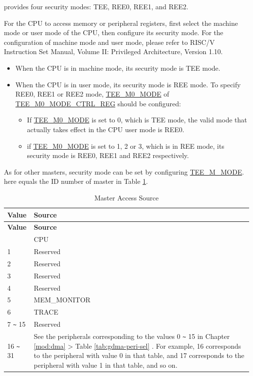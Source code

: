 \documentclass[main\_\_EN.tex]{subfiles}
\begin{document}
\chipname{} provides four security modes: TEE, REE0, REE1, and REE2.

For the CPU to access memory or peripheral registers, first select the machine mode or user mode of the CPU, then configure its security mode. For the configuration of machine mode and user mode, please refer to RISC\-/V Instruction Set Manual, Volume II: Privileged Architecture, Version 1.10.
\begin{itemize}
    \item When the CPU is in machine mode, its security mode is TEE mode.
    \item When the CPU is in user mode, its security mode is REE mode. To specify REE0, REE1 or REE2 mode, \hyperref[fielddesc:TEEM0MODE]{TEE\_M0\_MODE} of \hyperref[regdesc:TEEM0MODECTRLREG]{TEE\_M0\_MODE\_CTRL\_REG} should be configured:
    \begin{itemize}
        \item If \hyperref[fielddesc:TEEM0MODE]{TEE\_M0\_MODE} is set to 0, which is TEE mode, the valid mode that actually takes effect in the CPU user mode is REE0.
        \item if \hyperref[fielddesc:TEEM0MODE]{TEE\_M0\_MODE} is set to 1, 2 or 3, which is in REE mode, its security mode is REE0, REE1 and REE2 respectively.
    \end{itemize}
\end{itemize}

As for other masters, security mode can be set by configuring \hyperref[fielddesc:TEEM0MODE]{TEE\_M\_MODE}.  here equals the ID number of master in Table \ref{tab:master_source}.


\begin{longtable}[c]{|l|m{10cm}|}
\caption{Master Access Source}\label{tab:master_source}
\\\hline
\rowcolor{lightgray}
{\bfseries Value} & {\bfseries Source} \\\hline
\endfirsthead \hline \rowcolor{lightgray}
{\bfseries Value} & {\bfseries Source} \\\hline
\endhead \endfoot \hline \endlastfoot
0 & CPU \\\hline
1 & Reserved \\\hline
2 & Reserved \\\hline
3 & Reserved \\\hline
4 & Reserved \\\hline
5 & MEM\_MONITOR \\\hline
6 & TRACE \\\hline
7 \verb+~+ 15 & Reserved \\\hline
16 \verb+~+ 31 & See the peripherals corresponding to the values 0 \verb+~+ 15 in Chapter \ref{mod:dma} \textit{\nameref{mod:dma}} > Table \ref{tab:gdma-peri-sel} \textit{\nameref{tab:gdma-peri-sel}}. For example, 16 corresponds to the peripheral with value 0 in that table, and 17 corresponds to the peripheral with value 1 in that table, and so on.\\\hline
\end{longtable}
\end{document}
